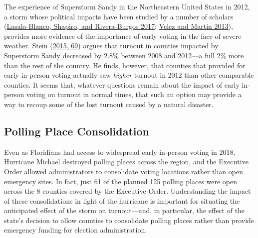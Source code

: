 \documentclass[
  12pt,
]{article}
\begin{document}
The experience of Superstorm Sandy in the Northeastern United States in 2012, a storm whose political impacts have been studied by a number of scholars (\protect\hyperlink{ref-Lasala-Blanco2017}{Lasala-Blanco, Shapiro, and Rivera-Burgos 2017}; \protect\hyperlink{ref-Velez2013}{Velez and Martin 2013}), provides more evidence of the importance of early voting in the face of severe weather. Stein (\protect\hyperlink{ref-Stein2015}{2015, 69}) argues that turnout in counties impacted by Superstorm Sandy decreased by 2.8\% between 2008 and 2012---a full 2\% more than the rest of the country. He finds, however, that counties that provided for early in-person voting actually saw \emph{higher} turnout in 2012 than other comparable counties. It seems that, whatever questions remain about the impact of early in-person voting on turnout in normal times, that such an option may provide a way to recoup some of the lost turnout caused by a natural disaster.

\hypertarget{polling-place-consolidation}{%
\subsection*{Polling Place Consolidation}\label{polling-place-consolidation}}

Even as Floridians had access to widespread early in-person voting in 2018, Hurricane Michael destroyed polling places across the region, and the Executive Order allowed administrators to consolidate voting locations rather than open emergency sites. In fact, just 61 of the planned 125 polling places were open across the 8 counties covered by the Executive Order. Understanding the impact of these consolidations in light of the hurricane is important for situating the anticipated effect of the storm on turnout---and, in particular, the effect of the state's decision to allow counties to consolidate polling places rather than provide emergency funding for election administration.
\end{document}
